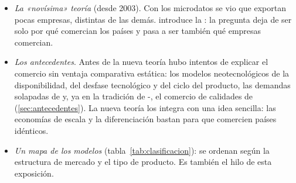 \documentclass[11pt]{article}
\begin{document}
\begin{itemize}
\begin{itemize}
\begin{itemize}
  \item \emph{La «novísima» teoría} (desde 2003). Con los microdatos se vio que exportan pocas empresas, distintas de las demás. \textcite{Melitz2003Impact} introduce la : la pregunta deja de ser solo por qué comercian los países y pasa a ser también qué empresas comercian.
  \item \emph{Los antecedentes}. Antes de la nueva teoría hubo intentos de explicar el comercio sin ventaja comparativa estática: los modelos neotecnológicos de la disponibilidad\nocite{Kravis1956Availability}, del desfase tecnológico\nocite{Posner1961International} y del ciclo del producto\nocite{Vernon1966International}, las demandas solapadas de \textcite{Linder1961Essay} y, ya en la tradición de -, el comercio de calidades de \textcite{Falvey1981Commercial} (\ref{sec:antecedentes}). La nueva teoría los integra con una idea sencilla: las economías de escala y la diferenciación bastan para que comercien países idénticos.
  \item \emph{Un mapa de los modelos} (tabla~\ref{tab:clasificacion}): se ordenan según la estructura de mercado y el tipo de producto. Es también el hilo de esta exposición.
  \end{itemize}
  \end{itemize}
\end{itemize}
\end{document}
